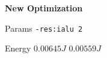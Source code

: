 
        \begin{tcolorbox}[width=\linewidth, colback=white!95!black, colframe=white!95!black]
            \begin{center}\textbf{New Optimization}\end{center}

            \tcblower
            
            Params \hfill \verb|-res:ialu 2|

            Energy \hfill \st{$0.00645J$} $0.00559J$

        \end{tcolorbox}
    